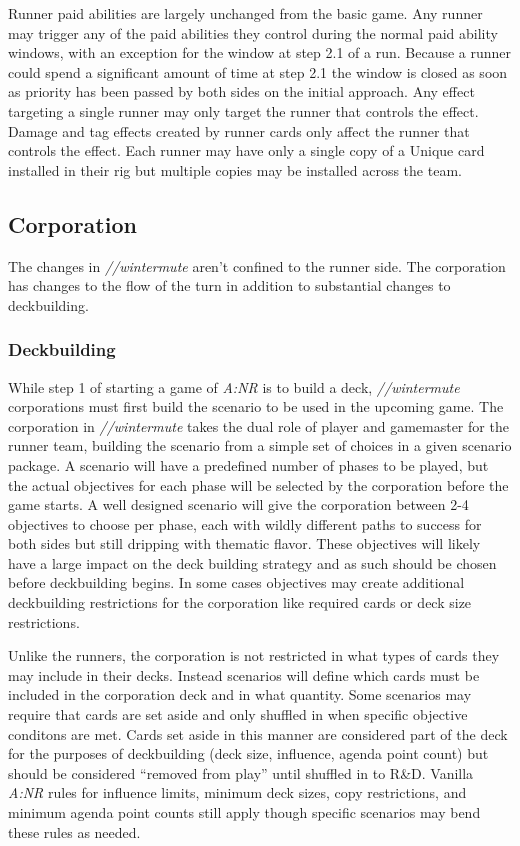 \documentclass[titlepage]{article}
\begin{document}
			Runner paid abilities are largely unchanged from the basic game. Any runner may trigger any of the paid abilities they control during the normal paid ability windows, with an exception for the window at step 2.1 of a run. Because a runner could spend a significant amount of time at step 2.1 the window is closed as soon as priority has been passed by both sides on the initial approach. Any effect targeting a single runner may only target the runner that controls the effect. Damage and tag effects created by runner cards only affect the runner that controls the effect. Each runner may have only a single copy of a Unique card installed in their rig but multiple copies may be installed across the team.

	\subsection{Corporation}

		The changes in \emph{//wintermute} aren't confined to the runner side. The corporation has changes to the flow of the turn in addition to substantial changes to deckbuilding.

		\subsubsection{Deckbuilding}
			While step 1 of starting a game of \emph{A:NR} is to build a deck, \emph{//wintermute} corporations must first build the scenario to be used in the upcoming game. The corporation in \emph{//wintermute} takes the dual role of player and gamemaster for the runner team, building the scenario from a simple set of choices in a given scenario package. A scenario will have a predefined number of phases to be played, but the actual objectives for each phase will be selected by the corporation before the game starts. A well designed scenario will give the corporation between 2-4 objectives to choose per phase, each with wildly different paths to success for both sides but still dripping with thematic flavor. These objectives will likely have a large impact on the deck building strategy and as such should be chosen before deckbuilding begins. In some cases objectives may create additional deckbuilding restrictions for the corporation like required cards or deck size restrictions.

			Unlike the runners, the corporation is not restricted in what types of cards they may include in their decks. Instead scenarios will define which cards must be included in the corporation deck and in what quantity. Some scenarios may require that cards are set aside and only shuffled in when specific objective conditons are met. Cards set aside in this manner are considered part of the deck for the purposes of deckbuilding (deck size, influence, agenda point count) but should be considered ``removed from play'' until shuffled in to R\&D. Vanilla \emph{A:NR} rules for influence limits, minimum deck sizes, copy restrictions, and minimum agenda point counts still apply though specific scenarios may bend these rules as needed.
\end{document}

